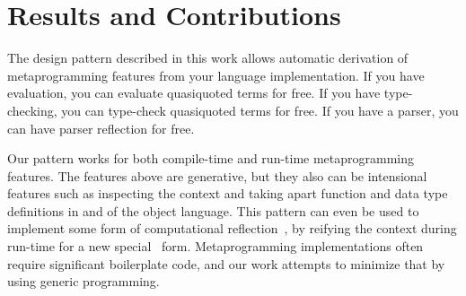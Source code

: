 \documentclass[format=acmsmall, review=false, screen=true]{acmart}
\begin{document}
\section{Results and Contributions}

The design pattern described in this work allows automatic derivation of metaprogramming features from your language implementation.
If you have evaluation, you can evaluate quasiquoted terms for free.
If you have type-checking, you can type-check quasiquoted terms for free.
If you have a parser, you can have parser reflection for free.

Our pattern works for both compile-time and run-time metaprogramming features.
The features above are generative, but they also can be intensional features
such as inspecting the context and taking apart function and data type
definitions in and of the object language. This pattern can even be used to
implement some form of computational
reflection~\cite{bcSmith,reflectionMasses}, by reifying the context during
run-time for a new special \textlambda\ form.
Metaprogramming implementations often require significant boilerplate code, and
our work attempts to minimize that by using generic programming.






\end{document}
